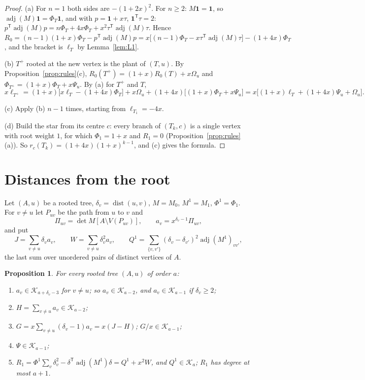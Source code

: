 \documentclass[11pt]{amsart}
\newtheorem{proposition}[theorem]{Proposition}
\theoremstyle{definition}
\theoremstyle{remark}
\newcommand{\adj}{\operatorname{adj}}
\newcommand{\K}{\mathcal K}
\newcommand{\one}{\mathbf 1}
\newcommand{\T}{\mathsf T}
\begin{document}
\begin{proof}
(a) For $n=1$ both sides are $-(1+2x)^2$. For $n\ge2$: $M\one=\one$, so
$\adj(M)\one=\Phi_T\one$, and with $p=\one+x\tau$, $\one^\T\tau=2$:
$p^\T\adj(M)p=n\Phi_T+4x\Phi_T+x^2\tau^\T\adj(M)\tau$. Hence
$R_0=(n-1)(1+x)\Phi_T-p^\T\adj(M)p=x\bigl[(n-1)\Phi_T-x\tau^\T\adj(M)\tau\bigr]-(1+4x)\Phi_T$,
and the bracket is $\ell_T$ by Lemma~\ref{lem:L1}.

(b) $T^+$ rooted at the new vertex is the plant of $(T,u)$. By
Proposition~\ref{prop:rules}(c), $R_0(T^+)=(1+x)R_0(T)+x\Omega_u$ and
$\Phi_{T^+}=(1+x)\Phi_T+x\Psi_u$. By (a) for $T^+$ and $T$,
\[
x\ell_{T^+}=(1+x)\bigl[x\ell_T-(1+4x)\Phi_T\bigr]+x\Omega_u+(1+4x)\bigl[(1+x)\Phi_T+x\Psi_u\bigr]
=x\bigl[(1+x)\ell_T+(1+4x)\Psi_u+\Omega_u\bigr].
\]

(c) Apply (b) $n-1$ times, starting from $\ell_{T_1}=-4x$.

(d) Build the star from its centre $c$: every branch of $(T_k,c)$ is a
single vertex with root weight $1$, for which $\Phi_1=1+x$ and $R_1=0$
(Proposition~\ref{prop:rules}(a)). So $r_c(T_k)=(1+4x)(1+x)^{k-1}$, and (c)
gives the formula.
\end{proof}

\section{Distances from the root}\label{sec:distances}

Let $(A,u)$ be a rooted tree, $\delta_v=\operatorname{dist}(u,v)$, $M=M_0$,
$M^1=M_1$, $\Phi^1=\Phi_1$. For $v\ne u$ let $P_{uv}$ be the path from $u$ to
$v$ and
\[
\Pi_{uv}=\det M[A\setminus V(P_{uv})],\qquad a_v=x^{\delta_v-1}\Pi_{uv},
\]
and put
\[
J=\sum_{v\ne u}\delta_va_v,\qquad W=\sum_{v\ne u}\delta_v^2a_v,\qquad
Q^1=\sum_{\{v,v'\}}(\delta_v-\delta_{v'})^2\adj(M^1)_{vv'},
\]
the last sum over unordered pairs of distinct vertices of $A$.

\begin{proposition}\label{prop:S33}
For every rooted tree $(A,u)$ of order $a$:
\begin{enumerate}
\item[(a)] $a_v\in\K_{a+\delta_v-3}$ for $v\ne u$; so $a_v\in\K_{a-2}$, and
$a_v\in\K_{a-1}$ if $\delta_v\ge2$;
\item[(b)] $H=\sum_{v\ne u}a_v\in\K_{a-2}$;
\item[(c)] $G=x\sum_{v\ne u}(\delta_v-1)a_v=x(J-H)$; $G/x\in\K_{a-1}$;
\item[(d)] $\Psi\in\K_{a-1}$;
\item[(e)] $R_1=\Phi^1\sum_v\delta_v^2-\delta^\T\adj(M^1)\delta=Q^1+x^2W$, and
$Q^1\in\K_a$; $R_1$ has degree at most $a+1$.
\end{enumerate}
\end{proposition}
\end{document}
